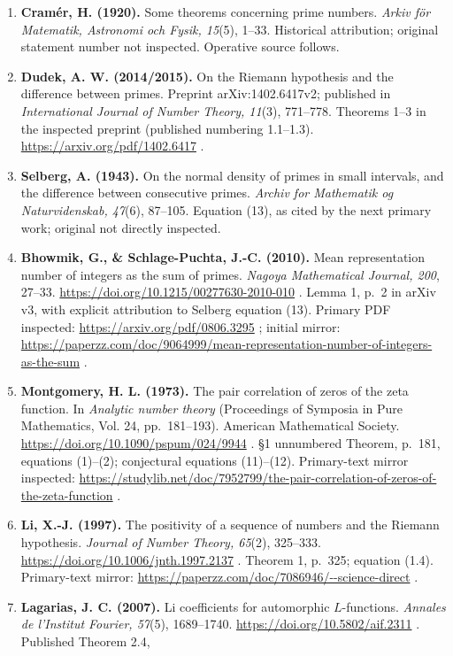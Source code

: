 \documentclass[11pt,a4paper]{article}
\theoremstyle{definition}\newtheorem{definition}[theorem]{Definition}
\theoremstyle{remark}\newtheorem{remark}[theorem]{Remark}
\begin{document}
\begin{enumerate}
  context.
\item
  \textbf{Cramér, H. (1920).} Some theorems concerning prime numbers.
  \emph{Arkiv för Matematik, Astronomi och Fysik, 15}(5), 1--33.
  Historical attribution; original statement number not inspected.
  Operative source follows.
\item
  \textbf{Dudek, A. W. (2014/2015).} On the Riemann hypothesis and the
  difference between primes. Preprint arXiv:1402.6417v2; published in
  \emph{International Journal of Number Theory, 11}(3), 771--778.
  Theorems 1--3 in the inspected preprint (published numbering
  1.1--1.3). \url{https://arxiv.org/pdf/1402.6417} .
\item
  \textbf{Selberg, A. (1943).} On the normal density of primes in small
  intervals, and the difference between consecutive primes. \emph{Archiv
  for Mathematik og Naturvidenskab, 47}(6), 87--105. Equation (13), as
  cited by the next primary work; original not directly inspected.
\item
  \textbf{Bhowmik, G., \& Schlage-Puchta, J.-C. (2010).} Mean
  representation number of integers as the sum of primes. \emph{Nagoya
  Mathematical Journal, 200}, 27--33.
  \url{https://doi.org/10.1215/00277630-2010-010} . Lemma 1, p.~2 in arXiv v3,
  with explicit attribution to Selberg equation (13). Primary PDF
  inspected: \url{https://arxiv.org/pdf/0806.3295} ; initial mirror:
  \url{https://paperzz.com/doc/9064999/mean-representation-number-of-integers-as-the-sum}
  .
\item
  \textbf{Montgomery, H. L. (1973).} The pair correlation of zeros of
  the zeta function. In \emph{Analytic number theory} (Proceedings of
  Symposia in Pure Mathematics, Vol. 24, pp.~181--193). American
  Mathematical Society. \url{https://doi.org/10.1090/pspum/024/9944} . §1
  unnumbered Theorem, p.~181, equations (1)--(2); conjectural equations
  (11)--(12). Primary-text mirror inspected:
  \url{https://studylib.net/doc/7952799/the-pair-correlation-of-zeros-of-the-zeta-function}
  .
\item
  \textbf{Li, X.-J. (1997).} The positivity of a sequence of numbers and
  the Riemann hypothesis. \emph{Journal of Number Theory, 65}(2),
  325--333. \url{https://doi.org/10.1006/jnth.1997.2137} . Theorem 1, p.~325;
  equation (1.4). Primary-text mirror:
  \url{https://paperzz.com/doc/7086946/--science-direct} .
\item
  \textbf{Lagarias, J. C. (2007).} Li coefficients for automorphic
  \(L\)-functions. \emph{Annales de l'Institut Fourier, 57}(5),
  1689--1740. \url{https://doi.org/10.5802/aif.2311} . Published Theorem 2.4,

\end{enumerate}
\end{document}
